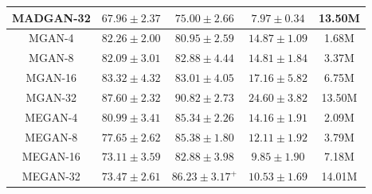 \documentclass[a4paper,onesided,12pt]{report}
\begin{document}
\begin{table}[thbp]
\begin{center}
\begin{tabular}{|c|c|c|c|c|}
MADGAN-32 & $67.96 \pm 2.37$ & $75.00 \pm 2.66$ & $7.97 \pm 0.34$ & 13.50M\\
\hline
MGAN-4 & $82.26 \pm 2.00$ & $80.95 \pm 2.59$ & $14.87 \pm 1.09$ & 1.68M\\
MGAN-8 & $82.09 \pm 3.01$ & $82.88 \pm 4.44$ & $14.81 \pm 1.84$ & 3.37M\\
MGAN-16 & $83.32 \pm 4.32$ & $83.01 \pm 4.05$ & $17.16 \pm 5.82$ & 6.75M\\
MGAN-32 & $87.60 \pm 2.32$ & $90.82 \pm 2.73$ & $24.60 \pm 3.82$ & 13.50M\\
\hline
MEGAN-4 & $80.99 \pm 3.41$ & $85.34 \pm 2.26$ & $14.16 \pm 1.91$ & 2.09M\\
MEGAN-8 & $77.65 \pm 2.62$ & $85.38 \pm 1.80$ & $12.11 \pm 1.92$ & 3.79M\\
MEGAN-16 & $73.11 \pm 3.59$ & $82.88 \pm 3.98$ & $9.85 \pm 1.90$ & 7.18M\\
MEGAN-32 & $73.47 \pm 2.61$ & $86.23 \pm 3.17^+$ & $10.53 \pm 1.69$ & 14.01M\\
\hline
\end{tabular}
\label{tab:res:related:mnist}
\end{center}
\end{table}
\end{document}
